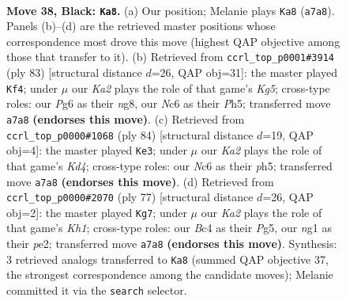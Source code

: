\documentclass[11pt]{article}
\begin{document}
\clearpage

\begin{figure}[p]\centering
\begin{subfigure}{0.46\textwidth}\centering
\resizebox{\linewidth}{!}{%
\newchessgame
\chessboard[
  setfen={8/k7/2nb2p1/6P1/p1b5/8/5B2/4K1N1 b - - 11 38},
  showmover=false,
  pgfstyle=straightmove, color=movearrow, markmove={a7-a8}
]}
\caption{}
\end{subfigure}\hfill
\begin{subfigure}{0.46\textwidth}\centering
\resizebox{\linewidth}{!}{%
\newchessgame
\chessboard[
  setfen={6N1/1bn5/8/7p/6k1/8/4B3/5K2 b - - 1 42},
  showmover=false,
  pgfstyle=straightmove, color=movearrow, markmove={g4-f4}
]}
\caption{}
\end{subfigure}
\\[4pt]
\begin{subfigure}{0.46\textwidth}\centering
\resizebox{\linewidth}{!}{%
\newchessgame
\chessboard[
  setfen={5k2/4b3/2B5/6np/1p1K4/8/P7/4B3 w - - 0 43},
  showmover=false,
  pgfstyle=straightmove, color=movearrow, markmove={d4-e3}
]}
\caption{}
\end{subfigure}\hfill
\begin{subfigure}{0.46\textwidth}\centering
\resizebox{\linewidth}{!}{%
\newchessgame
\chessboard[
  setfen={7k/8/8/p5pB/6K1/n7/4P2P/8 b - - 0 39},
  showmover=false,
  pgfstyle=straightmove, color=movearrow, markmove={h8-g7}
]}
\caption{}
\end{subfigure}
\caption{\textbf{Move 38, Black: \texttt{Ka8}.} (a) Our position; Melanie plays \texttt{Ka8} (\texttt{a7a8}). Panels (b)--(d) are the retrieved master positions whose correspondence most drove this move (highest QAP objective among those that transfer to it). (b) Retrieved from \texttt{ccrl\_top\_p0001\#3914} (ply 83) [structural distance $d$=26, QAP obj=31]: the master played \texttt{Kf4}; under $\mu$ our \emph{Ka2} plays the role of that game's \emph{Kg5}; cross-type roles: our \emph{P}g6 as their \emph{n}g8, our \emph{N}c6 as their \emph{P}h5; transferred move \texttt{a7a8} \textbf{(endorses this move)}. (c) Retrieved from \texttt{ccrl\_top\_p0000\#1068} (ply 84) [structural distance $d$=19, QAP obj=4]: the master played \texttt{Ke3}; under $\mu$ our \emph{Ka2} plays the role of that game's \emph{Kd4}; cross-type roles: our \emph{N}c6 as their \emph{p}h5; transferred move \texttt{a7a8} \textbf{(endorses this move)}. (d) Retrieved from \texttt{ccrl\_top\_p0000\#2070} (ply 77) [structural distance $d$=26, QAP obj=2]: the master played \texttt{Kg7}; under $\mu$ our \emph{Ka2} plays the role of that game's \emph{Kh1}; cross-type roles: our \emph{B}c4 as their \emph{P}g5, our \emph{n}g1 as their \emph{p}e2; transferred move \texttt{a7a8} \textbf{(endorses this move)}. Synthesis: 3 retrieved analogs transferred to \texttt{Ka8} (summed QAP objective 37, the strongest correspondence among the candidate moves); Melanie committed it via the \texttt{search} selector.}
\label{fig:thought-m75}
\end{figure}
\end{document}
